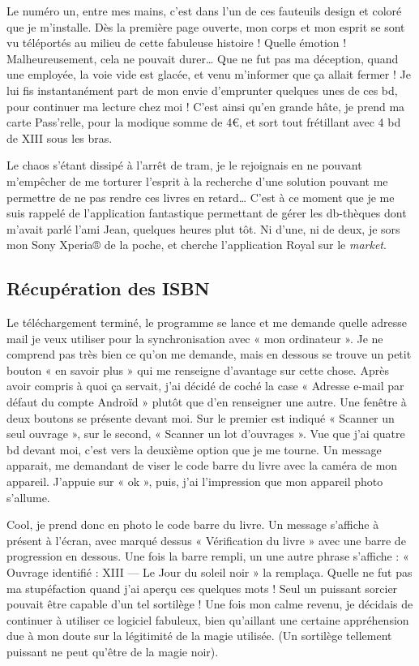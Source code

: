 Le numéro un, entre mes mains, c'est dans l'un de ces fauteuils design et coloré que je m'installe. 
Dès la première page ouverte, mon corps et mon esprit se sont vu téléportés au milieu de cette fabuleuse histoire !
Quelle émotion !
Malheureusement, cela ne pouvait durer… Que ne fut pas ma déception, quand une employée, la voie vide est glacée, et venu m'informer que ça allait fermer !
Je lui fis instantanément part de mon envie d'emprunter quelques unes de ces bd, pour continuer ma lecture chez moi !
C'est ainsi qu'en grande hâte, je prend ma carte Pass'relle, pour la modique somme de 4\euro{}, et sort tout frétillant avec 4 bd de XIII sous les bras. 

Le chaos s'étant dissipé à l'arrêt de tram, je le rejoignais en ne pouvant m'empêcher de me torturer l'esprit à la recherche d'une solution pouvant me permettre de ne pas rendre ces livres en retard…
C'est à ce moment que je me suis rappelé de l'application fantastique permettant de gérer les db-thèques dont m'avait parlé l'ami Jean, quelques heures plut tôt.
Ni d'une, ni de deux, je sors mon Sony Xperia® de la poche, et cherche l'application Royal sur le \emph{market}. 

\subsection{Récupération des ISBN}

Le téléchargement terminé, le programme se lance et me demande quelle adresse mail je veux utiliser pour la synchronisation avec « mon ordinateur ».
Je ne comprend pas très bien ce qu'on me demande, mais en dessous se trouve un petit bouton « en savoir plus » qui me renseigne d'avantage sur cette chose.
Après avoir compris à quoi ça servait, j'ai décidé de coché la case « Adresse e-mail par défaut du compte Androïd » plutôt que d'en renseigner une autre. 
Une fenêtre à deux boutons se présente devant moi.
Sur le premier est indiqué « Scanner un seul ouvrage », sur le second, « Scanner un lot d'ouvrages ». 
Vue que j'ai quatre bd devant moi, c'est vers la deuxième option que je me tourne. 
Un message apparait, me demandant de viser le code barre du livre avec la caméra de mon appareil. J'appuie sur « ok », puis, j'ai l'impression que mon appareil photo s'allume. 

Cool, je prend donc en photo le code barre du livre.
Un message s'affiche à présent à l'écran, avec marqué dessus « Vérification du livre » avec une barre de progression en dessous.
Une fois la barre rempli, un une autre phrase s'affiche : « Ouvrage identifié : XIII — Le Jour du soleil noir » la remplaça.
Quelle ne fut pas ma stupéfaction quand j'ai aperçu ces quelques mots !
Seul un puissant sorcier pouvait être capable d'un tel sortilège !
Une fois mon calme revenu, je décidais de continuer à utiliser ce logiciel fabuleux, bien qu'aillant une certaine appréhension due à mon doute sur la légitimité de la magie utilisée. 
(Un sortilège tellement puissant ne peut qu'être de la magie noir).

